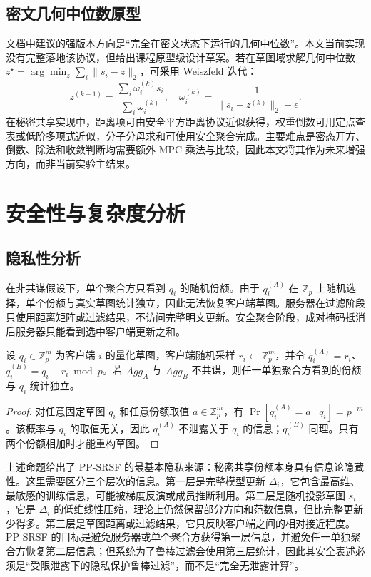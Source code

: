 \documentclass[final]{jcr}
\begin{document}
\subsection{密文几何中位数原型}
文档中建议的强版本方向是“完全在密文状态下运行的几何中位数”。本文当前实现没有完整落地该协议，但给出课程原型级设计草案。若在草图域求解几何中位数 $z^\star=\arg\min_z\sum_i\|s_i-z\|_2$，可采用 Weiszfeld 迭代：
\[
z^{(k+1)}=\frac{\sum_i \omega_i^{(k)}s_i}{\sum_i \omega_i^{(k)}},\quad
\omega_i^{(k)}=\frac{1}{\|s_i-z^{(k)}\|_2+\epsilon}.
\]
在秘密共享实现中，距离项可由安全平方距离协议近似获得，权重倒数可用定点查表或低阶多项式近似，分子分母求和可使用安全聚合完成。主要难点是密态开方、倒数、除法和收敛判断均需要额外 MPC 乘法与比较，因此本文将其作为未来增强方向，而非当前实验主结果。

\section{安全性与复杂度分析}
\subsection{隐私性分析}
在非共谋假设下，单个聚合方只看到 $q_i$ 的随机份额。由于 $q_i^{(A)}$ 在 $\mathbb{Z}_p$ 上随机选择，单个份额与真实草图统计独立，因此无法恢复客户端草图。服务器在过滤阶段只使用距离矩阵或过滤结果，不访问完整明文更新。安全聚合阶段，成对掩码抵消后服务器只能看到选中客户端更新之和。

\begin{proposition}
设 $q_i\in\mathbb{Z}_p^m$ 为客户端 $i$ 的量化草图，客户端随机采样 $r_i\leftarrow\mathbb{Z}_p^m$，并令 $q_i^{(A)}=r_i$、$q_i^{(B)}=q_i-r_i\bmod p$。若 $Agg_A$ 与 $Agg_B$ 不共谋，则任一单独聚合方看到的份额与 $q_i$ 统计独立。
\end{proposition}

\begin{proof}
对任意固定草图 $q_i$ 和任意份额取值 $a\in\mathbb{Z}_p^m$，有 $\Pr[q_i^{(A)}=a\mid q_i]=p^{-m}$。该概率与 $q_i$ 的取值无关，因此 $q_i^{(A)}$ 不泄露关于 $q_i$ 的信息；$q_i^{(B)}$ 同理。只有两个份额相加时才能重构草图。
\end{proof}

上述命题给出了 PP-SRSF 的最基本隐私来源：秘密共享份额本身具有信息论隐藏性。这里需要区分三个层次的信息。第一层是完整模型更新 $\Delta_i$，它包含最高维、最敏感的训练信息，可能被梯度反演或成员推断利用。第二层是随机投影草图 $s_i$，它是 $\Delta_i$ 的低维线性压缩，理论上仍然保留部分方向和范数信息，但比完整更新少得多。第三层是草图距离或过滤结果，它只反映客户端之间的相对接近程度。PP-SRSF 的目标是避免服务器或单个聚合方获得第一层信息，并避免任一单独聚合方恢复第二层信息；但系统为了鲁棒过滤会使用第三层统计，因此其安全表述必须是“受限泄露下的隐私保护鲁棒过滤”，而不是“完全无泄露计算”。
\end{document}
